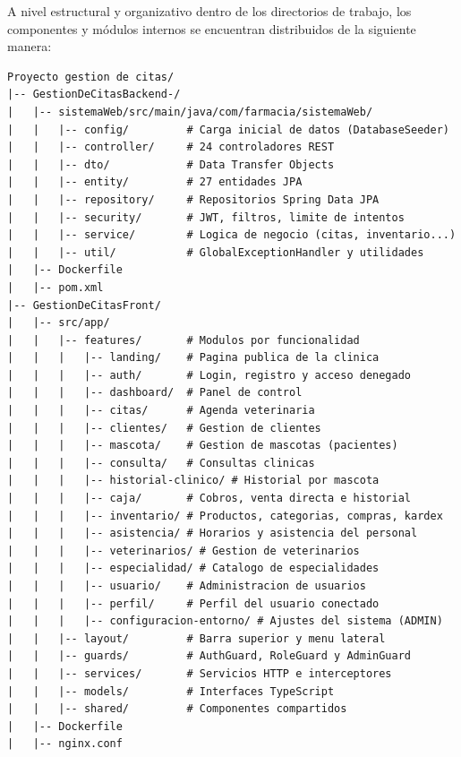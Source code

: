 \documentclass[11pt,a4paper]{report}
\begin{document}
A nivel estructural y organizativo dentro de los directorios de trabajo, los componentes y módulos internos se encuentran distribuidos de la siguiente manera:

\begin{lstlisting}[caption={Estructura detallada de directorios y módulos del proyecto}]
Proyecto gestion de citas/
|-- GestionDeCitasBackend-/
|   |-- sistemaWeb/src/main/java/com/farmacia/sistemaWeb/
|   |   |-- config/         # Carga inicial de datos (DatabaseSeeder)
|   |   |-- controller/     # 24 controladores REST
|   |   |-- dto/            # Data Transfer Objects
|   |   |-- entity/         # 27 entidades JPA
|   |   |-- repository/     # Repositorios Spring Data JPA
|   |   |-- security/       # JWT, filtros, limite de intentos
|   |   |-- service/        # Logica de negocio (citas, inventario...)
|   |   |-- util/           # GlobalExceptionHandler y utilidades
|   |-- Dockerfile
|   |-- pom.xml
|-- GestionDeCitasFront/
|   |-- src/app/
|   |   |-- features/       # Modulos por funcionalidad
|   |   |   |-- landing/    # Pagina publica de la clinica
|   |   |   |-- auth/       # Login, registro y acceso denegado
|   |   |   |-- dashboard/  # Panel de control
|   |   |   |-- citas/      # Agenda veterinaria
|   |   |   |-- clientes/   # Gestion de clientes
|   |   |   |-- mascota/    # Gestion de mascotas (pacientes)
|   |   |   |-- consulta/   # Consultas clinicas
|   |   |   |-- historial-clinico/ # Historial por mascota
|   |   |   |-- caja/       # Cobros, venta directa e historial
|   |   |   |-- inventario/ # Productos, categorias, compras, kardex
|   |   |   |-- asistencia/ # Horarios y asistencia del personal
|   |   |   |-- veterinarios/ # Gestion de veterinarios
|   |   |   |-- especialidad/ # Catalogo de especialidades
|   |   |   |-- usuario/    # Administracion de usuarios
|   |   |   |-- perfil/     # Perfil del usuario conectado
|   |   |   |-- configuracion-entorno/ # Ajustes del sistema (ADMIN)
|   |   |-- layout/         # Barra superior y menu lateral
|   |   |-- guards/         # AuthGuard, RoleGuard y AdminGuard
|   |   |-- services/       # Servicios HTTP e interceptores
|   |   |-- models/         # Interfaces TypeScript
|   |   |-- shared/         # Componentes compartidos
|   |-- Dockerfile
|   |-- nginx.conf
\end{lstlisting}
\end{document}
